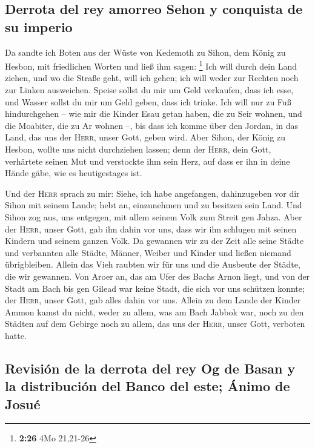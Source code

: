 \hypertarget{derrota-del-rey-amorreo-sehon-y-conquista-de-su-imperio}{%
\subsection{Derrota del rey amorreo Sehon y conquista de su
imperio}\label{derrota-del-rey-amorreo-sehon-y-conquista-de-su-imperio}}

 Da sandte ich Boten aus der Wüste von Kedemoth zu Sihon,
dem König zu Hesbon, mit friedlichen Worten und ließ ihm sagen:
\footnote{\textbf{2:26} 4Mo 21,21-26}  Ich will durch
dein Land ziehen, und wo die Straße geht, will ich gehen; ich will weder
zur Rechten noch zur Linken ausweichen.  Speise sollst du
mir um Geld verkaufen, dass ich esse, und Wasser sollst du mir um Geld
geben, dass ich trinke. Ich will nur zu Fuß hindurchgehen --
 wie mir die Kinder Esau getan haben, die zu Seir wohnen,
und die Moabiter, die zu Ar wohnen --, bis dass ich komme über den
Jordan, in das Land, das uns der \textsc{Herr}, unser Gott, geben wird.
 Aber Sihon, der König zu Hesbon, wollte uns nicht
durchziehen lassen; denn der \textsc{Herr}, dein Gott, verhärtete seinen
Mut und verstockte ihm sein Herz, auf dass er ihn in deine Hände gäbe,
wie es heutigestages ist.

 Und der \textsc{Herr} sprach zu mir: Siehe, ich habe
angefangen, dahinzugeben vor dir Sihon mit seinem Lande; hebt an,
einzunehmen und zu besitzen sein Land.  Und Sihon zog
aus, uns entgegen, mit allem seinem Volk zum Streit gen Jahza.
 Aber der \textsc{Herr}, unser Gott, gab ihn dahin vor
uns, dass wir ihn schlugen mit seinen Kindern und seinem ganzen Volk.
 Da gewannen wir zu der Zeit alle seine Städte und
verbannten alle Städte, Männer, Weiber und Kinder und ließen niemand
übrigbleiben.  Allein das Vieh raubten wir für uns und
die Ausbeute der Städte, die wir gewannen.  Von Aroer an,
das am Ufer des Bachs Arnon liegt, und von der Stadt am Bach bis gen
Gilead war keine Stadt, die sich vor uns schützen konnte; der
\textsc{Herr}, unser Gott, gab alles dahin vor uns. 
Allein zu dem Lande der Kinder Ammon kamst du nicht, weder zu allem, was
am Bach Jabbok war, noch zu den Städten auf dem Gebirge noch zu allem,
das uns der \textsc{Herr}, unser Gott, verboten hatte.

\hypertarget{revisiuxf3n-de-la-derrota-del-rey-og-de-basan-y-la-distribuciuxf3n-del-banco-del-este-uxe1nimo-de-josuuxe9}{%
\subsection{Revisión de la derrota del rey Og de Basan y la distribución
del Banco del este; Ánimo de
Josué}\label{revisiuxf3n-de-la-derrota-del-rey-og-de-basan-y-la-distribuciuxf3n-del-banco-del-este-uxe1nimo-de-josuuxe9}}


